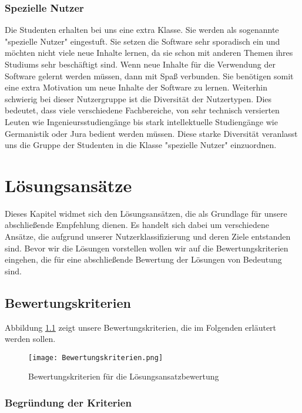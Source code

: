 \subsection{Spezielle Nutzer}
Die Studenten erhalten bei uns eine extra Klasse. Sie werden als sogenannte "spezielle Nutzer" eingestuft. Sie setzen die Software sehr sporadisch ein und möchten nicht viele neue Inhalte lernen, da sie schon mit anderen Themen ihres Studiums sehr beschäftigt sind. Wenn neue Inhalte für die Verwendung der Software gelernt werden müssen, dann mit Spaß verbunden. Sie benötigen somit eine extra Motivation um neue Inhalte der Software zu lernen. Weiterhin schwierig bei dieser Nutzergruppe ist die Diversität der Nutzertypen. Dies bedeutet, dass viele verschiedene Fachbereiche, von sehr technisch versierten Leuten wie Ingenieursstudiengänge bis stark intellektuelle Studiengänge wie Germanistik oder Jura bedient werden müssen. Diese starke Diversität veranlasst uns die Gruppe der Studenten in die Klasse "spezielle Nutzer" einzuordnen.



\chapter{Lösungsansätze}
Dieses Kapitel widmet sich den Lösungsansätzen, die als Grundlage für unsere abschließende Empfehlung dienen. Es handelt sich dabei um verschiedene Ansätze, die aufgrund unserer Nutzerklassifizierung und deren Ziele entstanden sind. Bevor wir die Lösungen vorstellen wollen wir auf die Bewertungskriterien eingehen, die für eine abschließende Bewertung der Lösungen von Bedeutung sind.
\section{Bewertungskriterien}
Abbildung \ref{img1:criteria} zeigt unsere Bewertungskriterien, die im Folgenden erläutert werden sollen.
\begin{figure}[ht]
\begin{center}
\texttt{[image: Bewertungskriterien.png]}
\caption{Bewertungskriterien für die Lösungsansatzbewertung}
\label{img1:criteria}
\end{center}
\end{figure} 

\subsection{Begründung der Kriterien}
